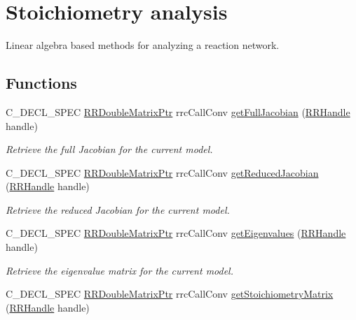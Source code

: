 \hypertarget{group___stoich}{}\section{Stoichiometry analysis}
\label{group___stoich}


Linear algebra based methods for analyzing a reaction network.  


\subsection*{Functions}
\begin{DoxyCompactItemize}
\item 
C\+\_\+\+D\+E\+C\+L\+\_\+\+S\+P\+E\+C \hyperlink{rrc__types_8h_ae586a879d30f0823087e42d93464b5dd}{R\+R\+Double\+Matrix\+Ptr} rrc\+Call\+Conv \hyperlink{group___stoich_ga6debd886f8814dec86b8eaa5c9d00a3e}{get\+Full\+Jacobian} (\hyperlink{rrc__types_8h_a1d68f0592372208fa5a5f2799ea4b3ae}{R\+R\+Handle} handle)
\begin{DoxyCompactList}\small\item\em Retrieve the full Jacobian for the current model. \end{DoxyCompactList}\item 
C\+\_\+\+D\+E\+C\+L\+\_\+\+S\+P\+E\+C \hyperlink{rrc__types_8h_ae586a879d30f0823087e42d93464b5dd}{R\+R\+Double\+Matrix\+Ptr} rrc\+Call\+Conv \hyperlink{group___stoich_ga0f121b1c3787ad8c932174a777a865e2}{get\+Reduced\+Jacobian} (\hyperlink{rrc__types_8h_a1d68f0592372208fa5a5f2799ea4b3ae}{R\+R\+Handle} handle)
\begin{DoxyCompactList}\small\item\em Retrieve the reduced Jacobian for the current model. \end{DoxyCompactList}\item 
C\+\_\+\+D\+E\+C\+L\+\_\+\+S\+P\+E\+C \hyperlink{rrc__types_8h_ae586a879d30f0823087e42d93464b5dd}{R\+R\+Double\+Matrix\+Ptr} rrc\+Call\+Conv \hyperlink{group___stoich_ga2f8e012b9cefe206bdbac30f07619613}{get\+Eigenvalues} (\hyperlink{rrc__types_8h_a1d68f0592372208fa5a5f2799ea4b3ae}{R\+R\+Handle} handle)
\begin{DoxyCompactList}\small\item\em Retrieve the eigenvalue matrix for the current model. \end{DoxyCompactList}\item 
C\+\_\+\+D\+E\+C\+L\+\_\+\+S\+P\+E\+C \hyperlink{rrc__types_8h_ae586a879d30f0823087e42d93464b5dd}{R\+R\+Double\+Matrix\+Ptr} rrc\+Call\+Conv \hyperlink{group___stoich_ga162f8d37e89e83e5e14cee87c02f89f2}{get\+Stoichiometry\+Matrix} (\hyperlink{rrc__types_8h_a1d68f0592372208fa5a5f2799ea4b3ae}{R\+R\+Handle} handle)

\end{DoxyCompactItemize}
